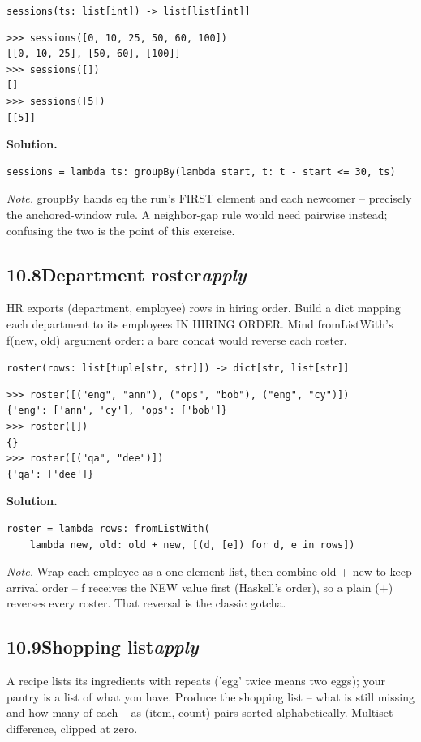 \documentclass[10pt,letterpaper]{book}
\begin{document}
\noindent\texttt{sessions(ts: list[int]) -> list[list[int]]}
\begin{lstlisting}[style=ex]
>>> sessions([0, 10, 25, 50, 60, 100])
[[0, 10, 25], [50, 60], [100]]
>>> sessions([])
[]
>>> sessions([5])
[[5]]
\end{lstlisting}
\noindent\textbf{Solution.}
\begin{lstlisting}[style=code]
sessions = lambda ts: groupBy(lambda start, t: t - start <= 30, ts)
\end{lstlisting}
\noindent\textit{Note.} groupBy hands eq the run's FIRST element and each newcomer -- precisely the anchored-window rule. A neighbor-gap rule would need pairwise instead; confusing the two is the point of this exercise.

\subsection*{10.8\quad Department roster\hfill\textnormal{\textit{apply}}}
HR exports (department, employee) rows in hiring order. Build a dict mapping each department to its employees IN HIRING ORDER. Mind fromListWith's f(new, old) argument order: a bare concat would reverse each roster.

\noindent\texttt{roster(rows: list[tuple[str, str]]) -> dict[str, list[str]]}
\begin{lstlisting}[style=ex]
>>> roster([("eng", "ann"), ("ops", "bob"), ("eng", "cy")])
{'eng': ['ann', 'cy'], 'ops': ['bob']}
>>> roster([])
{}
>>> roster([("qa", "dee")])
{'qa': ['dee']}
\end{lstlisting}
\noindent\textbf{Solution.}
\begin{lstlisting}[style=code]
roster = lambda rows: fromListWith(
    lambda new, old: old + new, [(d, [e]) for d, e in rows])
\end{lstlisting}
\noindent\textit{Note.} Wrap each employee as a one-element list, then combine old + new to keep arrival order -- f receives the NEW value first (Haskell's order), so a plain (+) reverses every roster. That reversal is the classic gotcha.

\subsection*{10.9\quad Shopping list\hfill\textnormal{\textit{apply}}}
A recipe lists its ingredients with repeats ('egg' twice means two eggs); your pantry is a list of what you have. Produce the shopping list -- what is still missing and how many of each -- as (item, count) pairs sorted alphabetically. Multiset difference, clipped at zero.
\end{document}
